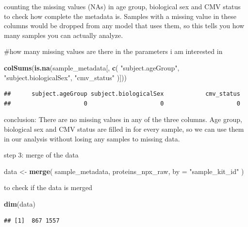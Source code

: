 \documentclass[
]{article}
\newenvironment{Shaded}{\begin{snugshade}}{\end{snugshade}}
\newcommand{\AttributeTok}[1]{\textcolor[rgb]{0.13,0.29,0.53}{#1}}
\newcommand{\FunctionTok}[1]{\textcolor[rgb]{0.13,0.29,0.53}{\textbf{#1}}}
\newcommand{\NormalTok}[1]{#1}
\newcommand{\OtherTok}[1]{\textcolor[rgb]{0.56,0.35,0.01}{#1}}
\newcommand{\StringTok}[1]{\textcolor[rgb]{0.31,0.60,0.02}{#1}}
\begin{document}
counting the missing values (NAs) in age group, biological sex and CMV
status to check how complete the metadata is. Samples with a missing
value in these columns would be dropped from any model that uses them,
so this tells you how many samples you can actually analyze.

\#how many missing values are there in the parameters i am interested in

\begin{Shaded}
\begin{Highlighting}[]
\FunctionTok{colSums}\NormalTok{(}\FunctionTok{is.na}\NormalTok{(sample\_metadata[, }\FunctionTok{c}\NormalTok{(}
  \StringTok{"subject.ageGroup"}\NormalTok{,}
  \StringTok{"subject.biologicalSex"}\NormalTok{,}
  \StringTok{"cmv\_status"}
\NormalTok{)]))}
\end{Highlighting}
\end{Shaded}

\begin{verbatim}
##      subject.ageGroup subject.biologicalSex            cmv_status 
##                     0                     0                     0
\end{verbatim}

conclusion: There are no missing values in any of the three columns. Age
group, biological sex and CMV status are filled in for every sample, so
we can use them in our analysis without losing any samples to missing
data.

step 3: merge of the data

\begin{Shaded}
\begin{Highlighting}[]
\NormalTok{data }\OtherTok{\textless{}{-}} \FunctionTok{merge}\NormalTok{(}
\NormalTok{  sample\_metadata,}
\NormalTok{  proteins\_npx\_raw,}
  \AttributeTok{by =} \StringTok{"sample\_kit\_id"}
\NormalTok{)}
\end{Highlighting}
\end{Shaded}

to check if the data is merged

\begin{Shaded}
\begin{Highlighting}[]
\FunctionTok{dim}\NormalTok{(data)}
\end{Highlighting}
\end{Shaded}

\begin{verbatim}
## [1]  867 1557
\end{verbatim}
\end{document}
